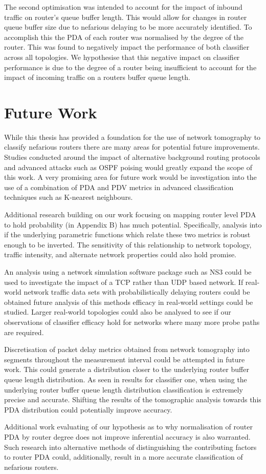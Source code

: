The second optimisation was intended to account for the impact of inbound traffic on router's queue buffer length. This would allow for changes in router queue buffer size due to nefarious delaying to be more accurately identified. To accomplish this the PDA of each router was normalised by the degree of the router. This was found to negatively impact the performance of both classifier across all topologies. We hypothesise that this negative impact on classifier performance is due to the degree of a router being insufficient to account for the impact of incoming traffic on a routers buffer queue length.\par

\section{Future Work}
\label{sec:Cfuture}
While this thesis has provided a foundation for the use of network tomography to classify nefarious routers there are many areas for potential future improvements. Studies conducted around the impact of alternative background routing protocols and advanced attacks such as OSPF poising would greatly expand the scope of this work. A very promising area for future work would be investigation into the use of a combination of PDA and PDV metrics in advanced classification techniques such as K-nearest neighbours.\par
Additional research building on our work focusing on mapping router level PDA to hold probability (in Appendix B) has much potential. Specifically, analysis into if the underlying parametric functions which relate these two metrics is robust enough to be inverted. The sensitivity of this relationship to network topology, traffic intensity, and alternate network properties could also hold promise.\par 
An analysis using a network simulation software package such as NS3 could be used to investigate the impact of a TCP rather than UDP based network. If real-world network traffic data sets with probabilistically delaying routers could be obtained future analysis of this methods efficacy in real-world settings could be studied. Larger real-world topologies could also be analysed to see if our observations of classifier efficacy hold for networks where many more probe paths are required.\par
Discretisation of packet delay metrics obtained from network tomography into segments throughout the measurement interval could be attempted in future work. This could generate a distribution closer to the underlying router buffer queue length distribution. As seen in results for classifier one, when using the underlying router buffer queue length distribution classification is extremely precise and accurate. Shifting the results of the tomographic analysis towards this PDA distribution could potentially improve accuracy.\par
Additional work evaluating of our hypothesis as to why normalisation of router PDA by router degree does not improve inferential accuracy is also warranted. Such research into alternative methods of distinguishing the contributing factors to router PDA could, additionally, result in a more accurate classification of nefarious routers.
